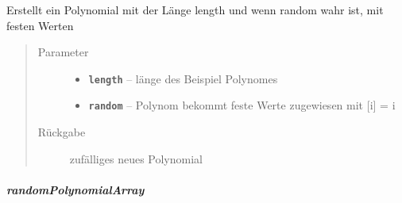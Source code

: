 \documentclass[letterpaper,10pt,ngerman]{sphinxmanual}
\begin{document}
\begin{fulllineitems}
\label{com/linuxluigi/polynomial/PolynomialList:com.linuxluigi.polynomial.PolynomialList.randomPolynomial(int, boolean)}
Erstellt ein Polynomial mit der Länge length und wenn random wahr ist, mit festen Werten
\begin{quote}\begin{description}
\item[{Parameter}] \leavevmode\begin{itemize}
\item {} 
\textbf{\texttt{length}} -- länge des Beispiel Polynomes

\item {} 
\textbf{\texttt{random}} -- Polynom bekommt feste Werte zugewiesen mit {[}i{]} = i

\end{itemize}

\item[{Rückgabe}] \leavevmode
zufälliges neues Polynomial

\end{description}\end{quote}

\end{fulllineitems}



\subparagraph{randomPolynomialArray}
\label{com/linuxluigi/polynomial/PolynomialList:randompolynomialarray}
\end{document}
